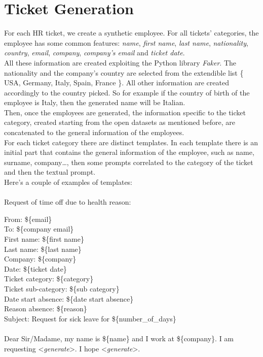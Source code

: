 \section{Ticket Generation}
For each HR ticket, we create a synthetic employee. For all tickets' categories, the employee has some common features: \textit{name}, \textit{first name}, \textit{last name}, \textit{nationality}, \textit{country}, \textit{email}, \textit{company}, \textit{company's email} and \textit{ticket date}.\\
All these information are created exploiting the Python library \textit{Faker}. The nationality and the company's country are selected from the extendible list \{ USA, Germany, Italy, Spain, France \}. All other information are created accordingly to the country picked. So for example if the country of birth of the employee is Italy, then the generated name will be Italian. \\
Then, once the employees are generated, the information specific to the ticket category, created starting from the open datasets as mentioned before, are concatenated to the general information of the employees. \\
For each ticket category there are distinct templates. In each template there is an initial part that contains the general information of the employee, such as name, surname, company\dots, then some prompts correlated to the category of the ticket and then the textual prompt. \\
Here's a couple of examples of templates:\\ \\
Request of time off due to health reason:
\begin{adjustwidth}{1cm}{}
From: \$\{email\} \\
To: \$\{company email\} \\
First name: \$\{first name\}\\
Last name: \$\{last name\}\\
Company: \$\{company\}\\
Date: \$\{ticket date\}\\
Ticket category: \$\{category\}\\
Ticket sub-category: \$\{sub category\} \\
Date start absence: \$\{date start absence\} \\
Reason absence: \$\{reason\} \\ 
Subject: Request for sick leave for \$\{number\_of\_days\} \\ 
\\
Dear Sir/Madame, my name is \$\{name\} and I work at \$\{company\}. I am requesting \textless \textit{generate}\textgreater. I hope \textless \textit{generate}\textgreater. \\ \\

\end{adjustwidth}
